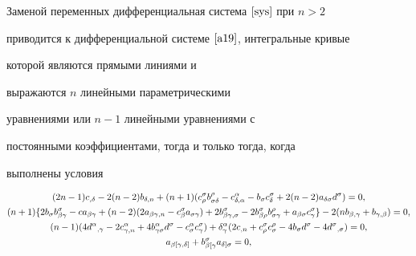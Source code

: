 \begin{thms}\label{th4} 


Заменой переменных дифференциальная система $\eqref{sys}$ при $n>2$


приводится к дифференциальной системе $\eqref{a19}$, интегральные кривые


которой являются прямыми линиями и


выражаются $n$ линейными параметрическими


уравнениями или $n-1$ линейными уравнениями с


постоянными коэффициентами, тогда и только тогда, когда


выполнены условия


\begin{gather}


(2n-1)c_{,\delta}-2(n-2)b_{\delta,n}+


(n+1)(c^\sigma_\rho


b^\rho_{\sigma\delta}-c^\alpha_{\delta,\alpha}-b_\sigma c^\sigma_\delta+


2(n-2)a_{\delta\sigma}d^\sigma)=0, \notag \\


%


(n+1)\{2b_\sigma b^\sigma_{\beta\gamma}-c a_{\beta\gamma}+


(n-2)(2a_{\beta\gamma,n}-c^\sigma_\beta


a_{\sigma\gamma})+2b^\sigma_{\beta\gamma,\sigma}-2b^\sigma_{\beta\rho}


b^\rho_{\sigma\gamma}+a_{\beta\sigma}c^\sigma_\gamma\}


-2(nb_{\beta,\gamma}+b_{\gamma,\beta})=0, \notag \\


%


(n-1)(4d^\alpha{}_{,\gamma}


-2c^\alpha_{\gamma,n}+4b^\alpha_{


\gamma\sigma} d^{\sigma}-c^\alpha_\sigma c^\sigma_\gamma)+


\delta^\alpha_\gamma(2c_{,n}+ c^\sigma_\rho c^\rho_\sigma-


4b_{\sigma}d^\sigma-4d^\sigma{}_{,\sigma})=0,\notag \\


%


\label{t-Usl}


a{}_{\beta[\gamma,\delta]}+b{}^\sigma_{\beta[\gamma}a{}_{\delta]\sigma}=0, \\


%



\end{gather}
\end{thms}
